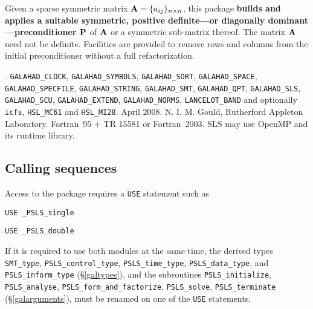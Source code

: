 \documentclass{galahad}
\newcommand{\packagename}{PSLS}
\newcommand{\fullpackagename}{\libraryname\_\-\packagename}
\begin{document}
\galheader


\galsummary

Given a sparse symmetric matrix ${\mathbf{A}} = \{ a_{ij} \}_{n \times n}$, this package
{\bf builds and applies a suitable symmetric, positive definite---or 
diagonally dominant---preconditioner ${\mathbf{P}}$} of ${\mathbf{A}}$ or a symmetric 
sub-matrix thereof. The matrix ${\mathbf{A}}$ need not be definite. Facilities
are provided to remove rows and columns from the initial preconditioner
without a full refactorization.


\galattributes
\galversions{\tt  \fullpackagename\_single, \fullpackagename\_double}.
\galcalls
{\tt GALAHAD\_CLOCK},
{\tt GALAHAD\-\_SYMBOLS},
{\tt GALAHAD\_\-SORT},
{\tt GALAHAD\_SPACE},
{\tt GALAHAD\_SPECFILE},
{\tt GALAHAD\_STRING},
{\tt GALAHAD\_SMT},
{\tt GALAHAD\_QPT},
{\tt GALAHAD\_SLS},
{\tt GALAHAD\_SCU},
{\tt GALAHAD\_EXTEND},
{\tt GALAHAD\_NORMS},
{\tt LANCELOT\_BAND}
and optionally
{\tt icfs},
{\tt HSL\_\-MC61} and
{\tt HSL\_\-MI28}.
\galdate April 2008.
\galorigin N. I. M. Gould, Rutherford Appleton Laboratory.
\gallanguage Fortran~95 + TR 15581 or Fortran~2003.
\galparallelism SLS may use OpenMP and its runtime library.


\galhowto

\subsection{Calling sequences}

Access to the package requires a {\tt USE} statement such as

\medskip{}

\hskip0.5in {\tt USE \fullpackagename\_single}

\medskip{}

\hskip0.5in {\tt USE  \fullpackagename\_double}

\medskip

If it is required to use both modules at the same time, the derived types
{\tt SMT\_type},
{\tt \packagename\_control\_type},
{\tt \packagename\_time\-\_type},
{\tt \packagename\_data\-\_type}, and
{\tt \packagename\_inform\_type}
(\S\ref{galtypes}),
and the subroutines
{\tt \packagename\_initialize},
{\tt \packagename\_analyse},
{\tt \packagename\-\_form\_and\_factorize},
{\tt \packagename\_solve},
{\tt \packagename\_terminate}
(\S\ref{galarguments}),
must be renamed on one of the {\tt USE} statements.
\end{document}
